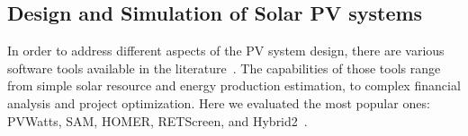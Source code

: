 \documentclass[journal]{IEEEtran}
\begin{document}
\subsection{Design and Simulation of Solar PV systems}
%
In order to address different aspects of the PV system design, there are various software tools available in the literature~\cite{Rajanna,Rawat}.
The capabilities of those tools range from simple solar resource and energy production estimation, %
 to complex financial analysis and project optimization. 
%
Here we evaluated the most popular ones: PVWatts, SAM, HOMER, RETScreen, and Hybrid2~\cite{Pradhan,Swarnkar,NRELDobos,NRELBlair,Mills}.

\end{document}

